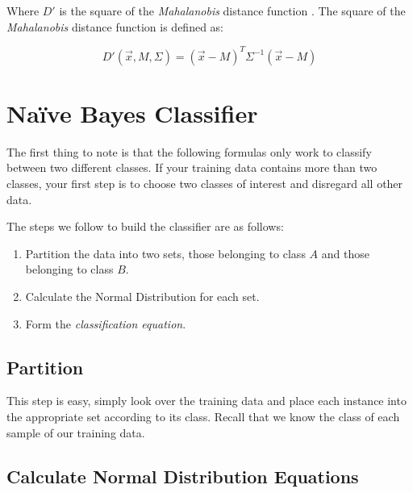 \documentclass{article}
\begin{document}
Where $D'$ is the square of the \emph{Mahalanobis} distance function
\cite{wiki_mahalanobis}.  The square of the \emph{Mahalanobis} distance
function is defined as:

\begin{displaymath}
  D'(\vec{x},M,\Sigma) = (\vec{x}-M)^T \Sigma^{-1} (\vec{x}-M)
\end{displaymath}


\section{Na\"ive Bayes Classifier}
\label{sec:nbayes}

The first thing to note is that the following formulas only work to
classify between two different classes.  If your training data
contains more than two classes, your first step is to choose two
classes of interest and disregard all other data.

The steps we follow to build the classifier are as follows:

\begin{enumerate}

\item Partition the data into two sets, those belonging to class $A$
  and those belonging to class $B$.

\item Calculate the Normal Distribution for each set.

\item Form the \emph{classification equation}.

\end{enumerate}

\subsection{Partition}

This step is easy, simply look over the training data and place each
instance into the appropriate set according to its class.  Recall that
we know the class of each sample of our training data.

\subsection{Calculate Normal Distribution Equations}
\label{ss:norm_dist}
\end{document}
